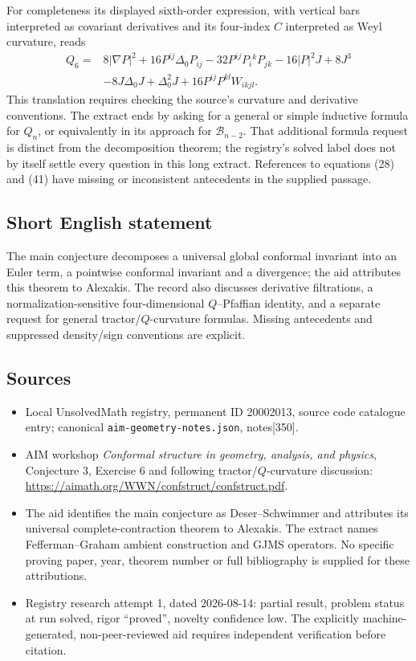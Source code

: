\documentclass[11pt]{article}
\begin{document}
For completeness its displayed sixth-order expression, with vertical bars interpreted as covariant derivatives and its four-index $C$ interpreted as Weyl curvature, reads
\[
\begin{aligned}
 Q_6={}&8|\nabla P|^2+16P^{ij}\Delta_0P_{ij}
 -32P^{ij}P_i{}^kP_{jk}-16|P|^2J+8J^3\\
 &-8J\Delta_0J+\Delta_0^2J+16P^{ij}P^{kl}W_{ikjl}.
\end{aligned}
\]
This translation requires checking the source's curvature and derivative conventions. The extract ends by asking for a general or simple inductive formula for $Q_n$, or equivalently in its approach for $\mathcal B_{n-2}$. That additional formula request is distinct from the decomposition theorem; the registry's solved label does not by itself settle every question in this long extract. References to equations (28) and (41) have missing or inconsistent antecedents in the supplied passage.
\subsection{Short English statement}
The main conjecture decomposes a universal global conformal invariant into an Euler term, a pointwise conformal invariant and a divergence; the aid attributes this theorem to Alexakis. The record also discusses derivative filtrations, a normalization-sensitive four-dimensional $Q$--Pfaffian identity, and a separate request for general tractor/$Q$-curvature formulas. Missing antecedents and suppressed density/sign conventions are explicit.
\subsection{Sources}
\begin{itemize}
\item Local UnsolvedMath registry, permanent ID 20002013, source code catalogue entry; canonical \texttt{aim-geometry-notes.json}, notes[350].
\item AIM workshop \emph{Conformal structure in geometry, analysis, and physics}, Conjecture 3, Exercise 6 and following tractor/$Q$-curvature discussion: \url{https://aimath.org/WWN/confstruct/confstruct.pdf}.
\item The aid identifies the main conjecture as Deser--Schwimmer and attributes its universal complete-contraction theorem to Alexakis. The extract names Fefferman--Graham ambient construction and GJMS operators. No specific proving paper, year, theorem number or full bibliography is supplied for these attributions.
\item Registry research attempt 1, dated 2026-08-14: partial result, problem status at run solved, rigor ``proved'', novelty confidence low. The explicitly machine-generated, non-peer-reviewed aid requires independent verification before citation.
\end{itemize}
\end{document}
